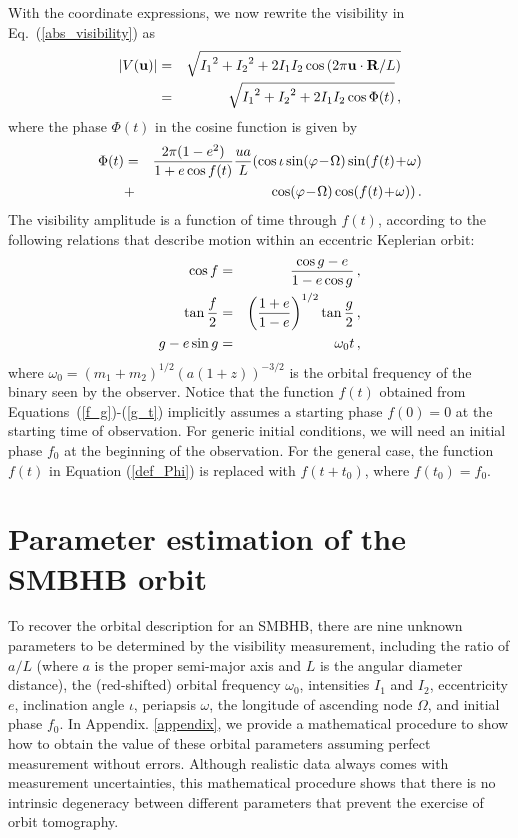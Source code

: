 \documentclass[twocolumn]{aastex62}
\def\m{\begin{eqnarray}}
\def\n{\end{eqnarray}}
\begin{document}
With the coordinate expressions, we now rewrite the visibility in Eq.~(\ref{abs_visibility}) as
\m \label{absV}
|V({{\bf u}})|&=&\sqrt{ {I_1}^2+{I_2}^2+2 I_1 I_2 \cos{(2 \pi {\bf u}\cdot{\bf R}/L)} } \nonumber\\
&=&\sqrt{ {I_1}^2+{I_2}^2+ 2 I_1 I_2 \cos{\Phi(t)} } \,, 
\n
where the phase $\Phi(t)$ in the cosine function is given by 
\m \label{def_Phi}
\Phi(t)&=&\frac{2 \pi (1-e^2) }{1+e \cos f(t)} {ua\over L} ( \cos \iota  \sin (\varphi \!-\! \Omega ) \sin (f(t)  \!+\! \omega ) \nonumber\\
&+& \cos (\varphi \!-\! \Omega ) \cos (f(t) \!+\! \omega ) ) \,. 
\n
The visibility amplitude is a function of time through $f(t)$, according to the following relations that describe motion within an eccentric Keplerian orbit:
\m \label{f_g}
\cos{f}&=&{\cos{g}-e\over 1-e \cos{g}} \,,\\
\tan{f\over 2}&=&\left({1+e\over1-e}\right)^{1/2}\tan{g\over 2}\,,\\
\label{g_t}
g-e \sin{g}&=&\omega_0 t\,,
\n
where $\omega_0=(m_1+ m_2)^{1/2}(a(1+z))^{-3/2}$ is the orbital frequency of the binary seen by the observer. Notice that the function $f(t)$ obtained from Equations~(\ref{f_g})-(\ref{g_t}) implicitly assumes a starting phase $f(0)=0$ at the starting time of observation. For generic initial conditions, we will need  an initial phase $f_0$ at the beginning of the observation. For the general case, the function $f(t)$ in Equation (\ref{def_Phi}) is replaced with $f(t+t_0)$, where $f(t_0)=f_0$.   
%


\section{Parameter estimation of the SMBHB orbit}
\label{SMBHB_likelihood_estimation}
%

To recover the orbital description for an SMBHB, there are nine unknown parameters to be determined by the visibility measurement,  including the ratio of $a/L$ (where $a$ is the proper semi-major axis and $L$ is the angular diameter distance), the (red-shifted) orbital frequency $\omega_0$, intensities $I_1$ and $I_2$, eccentricity $e$, inclination angle $\iota$, periapsis $\omega$, the longitude of ascending node $\Omega$, and initial phase $f_0$. In Appendix. \ref{appendix}, we provide a mathematical procedure to show how to obtain the value of these orbital parameters assuming perfect measurement without errors. Although realistic data always comes with measurement uncertainties, this mathematical procedure shows that there is no intrinsic degeneracy between different parameters that prevent the exercise of orbit tomography. 
\end{document}
